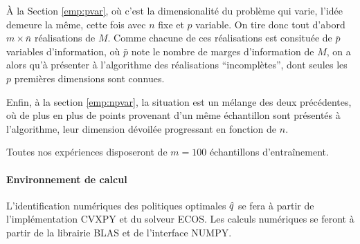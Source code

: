 À la Section \ref{emp:pvar}, où c'est la dimensionalité du problème qui varie, l'idée
demeure la même, cette fois avec $n$ fixe et $p$ variable. On tire donc tout d'abord
$m\times\bar n$ réalisations de $M$. Comme chacune de ces réalisations est consituée de $\bar
p$ variables d'information, où $\bar p$ note le nombre de marges d'information de $M$, on
a alors qu'à présenter à l'algorithme des réalisations ``incomplètes'', dont seules les
$p$ premières dimensions sont connues.

Enfin, à la section \ref{emp:npvar}, la situation est un mélange des deux précédentes, où
de plus en plus de points provenant d'un même échantillon sont présentés à l'algorithme,
leur dimension dévoilée progressant en fonction de $n$. 

Toutes nos expériences disposeront de $m=100$ échantillons d'entraînement.



\paragraph{Environnement de calcul}

L'identification numériques des politiques optimales $\hat q$ se fera à partir de
l'implémentation CVXPY\cite{cvxpy} et du solveur ECOS\cite{ecos}. Les calculs numériques
se feront à partir de la librairie BLAS et de l'interface NUMPY.

\newpage

